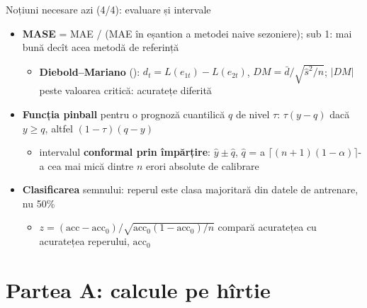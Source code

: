 \begin{frame}{Noțiuni necesare azi (4/4): evaluare și intervale}
\itemsize{\footnotesize}
\begin{itemize}
    \item \textbf{MASE} = MAE / (MAE în eșantion a metodei naive sezoniere); sub 1: mai bună decît acea metodă de referință
    \begin{itemize}
        \item \textbf{Diebold--Mariano} (): $d_t = L(e_{1t}) - L(e_{2t})$, $DM = \bar d / \sqrt{\hat s^2/n}$; $|DM|$ peste valoarea critică: acuratețe diferită
    \end{itemize}
    \item \textbf{Funcția pinball} pentru o prognoză cuantilică $q$ de nivel $\tau$: $\tau(y - q)$ dacă $y \ge q$, altfel $(1 - \tau)(q - y)$
    \begin{itemize}
        \item intervalul \textbf{conformal prin împărțire}: $\hat y \pm \hat q$, $\hat q$ = a $\lceil (n+1)(1 - \alpha) \rceil$-a cea mai mică dintre $n$ erori absolute de calibrare
    \end{itemize}
    \item \textbf{Clasificarea} semnului: reperul este clasa majoritară din datele de antrenare, nu 50\%
    \begin{itemize}
        \item $z = (\text{acc} - \text{acc}_0)/\sqrt{\text{acc}_0(1 - \text{acc}_0)/n}$ compară acuratețea cu acuratețea reperului, $\text{acc}_0$
    \end{itemize}
\end{itemize}
\end{frame}


\section{Partea A: calcule pe hîrtie}

